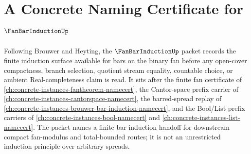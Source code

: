 \chapter{A Concrete Naming Certificate for $\FanBarInductionUp$}
\label{ch:concrete-instances-fan-bar-induction-namecert}

Following Brouwer and Heyting, the $\FanBarInductionUp$ packet records the finite induction surface available for bars on the binary fan before any open-cover compactness, branch selection, quotient stream equality, countable choice, or ambient Real-completeness claim is read. It sits after the finite fan certificate of \autoref{ch:concrete-instances-fantheorem-namecert}, the Cantor-space prefix carrier of \autoref{ch:concrete-instances-cantorspace-namecert}, the barred-spread replay of \autoref{ch:concrete-instances-brouwer-bar-induction-namecert}, and the Bool/List prefix carriers of \autoref{ch:concrete-instances-bool-namecert} and \autoref{ch:concrete-instances-list-namecert}. The packet names a finite bar-induction handoff for downstream compact fan-modulus and total-bounded routes; it is not an unrestricted induction principle over arbitrary spreads.

